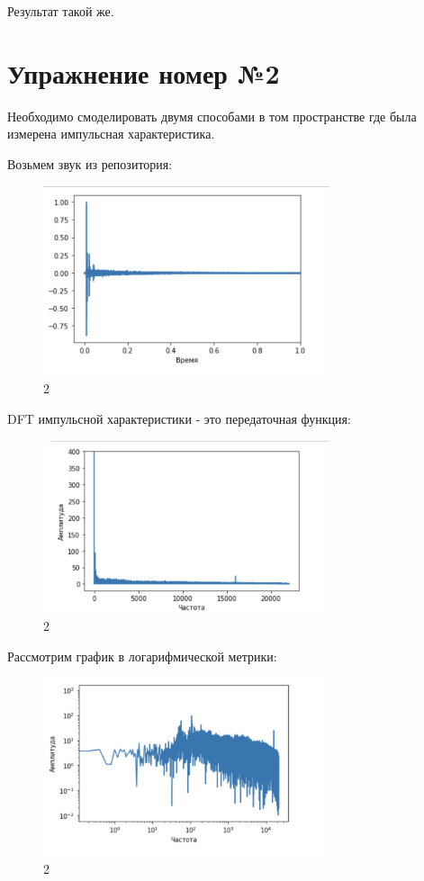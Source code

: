 \documentclass[10pt,a4paper,oneside]{article}
\begin{document}
Результат такой же.

\section{Упражнение номер №2}

Необходимо смоделировать двумя способами в том пространстве где была измерена импульсная характеристика.

Возьмем звук из репозитория: 

\begin{figure}[H]
        \centering
        \includegraphics[width=0.75\textwidth]{pics/9.png}
        \caption{2}
        \label{fig:first}
\end{figure}

DFT импульсной характеристики - это передаточная функция:

\begin{figure}[H]
        \centering
        \includegraphics[width=0.75\textwidth]{pics/10.png}
        \caption{2}
        \label{fig:first}
\end{figure}

Рассмотрим график в логарифмической метрики:

\begin{figure}[H]
        \centering
        \includegraphics[width=0.75\textwidth]{pics/11.png}
        \caption{2}
        \label{fig:first}
\end{figure}
\end{document}
